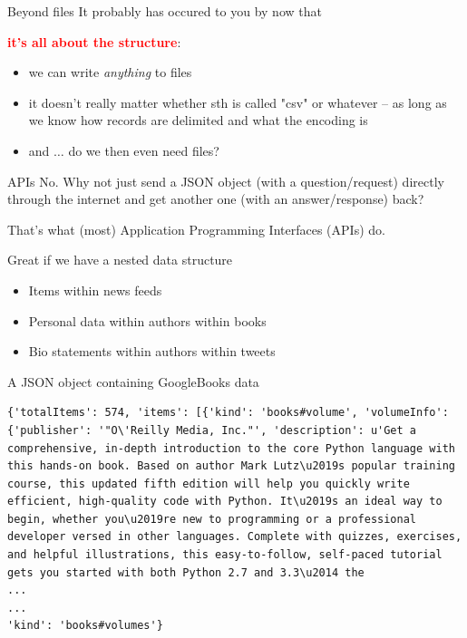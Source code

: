\documentclass[compress]{beamer}
\begin{document}
\begin{frame}{Beyond files}
It probably has occured to you by now that


\textcolor{red}{\large{\textbf{it's all about the structure}}}:
\begin{itemize}
	\item<2-> we can write \textit{anything} to files
	\item<3-> it doesn't really matter whether sth is called "csv" or whatever -- as long as we know how records are delimited and what the encoding is
	\item<4-> and $\ldots$ do we then even need files?
\end{itemize}

\end{frame}

\begin{frame}{APIs}
	{\huge{No.}}
	Why not just send a JSON object (with a question/request) directly through the internet and get another one (with an answer/response) back?
	
	That's what (most) Application Programming Interfaces (APIs) do.
	
	\begin{block}{Great if we have a nested data structure}
		\begin{itemize}
			\item<2-> Items within news feeds
			\item<3-> Personal data within authors within books
			\item<4-> Bio statements within authors within tweets
		\end{itemize}
	\end{block}
\end{frame}


\begin{frame}[fragile]{A JSON object containing GoogleBooks data}
	\begin{lstlisting}
{'totalItems': 574, 'items': [{'kind': 'books#volume', 'volumeInfo': {'publisher': '"O\'Reilly Media, Inc."', 'description': u'Get a comprehensive, in-depth introduction to the core Python language with this hands-on book. Based on author Mark Lutz\u2019s popular training course, this updated fifth edition will help you quickly write efficient, high-quality code with Python. It\u2019s an ideal way to begin, whether you\u2019re new to programming or a professional developer versed in other languages. Complete with quizzes, exercises, and helpful illustrations, this easy-to-follow, self-paced tutorial gets you started with both Python 2.7 and 3.3\u2014 the
...
...
'kind': 'books#volumes'}
	\end{lstlisting}
\end{frame}
\end{document}
